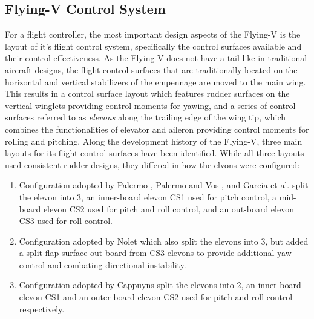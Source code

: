 \documentclass[../report.tex]{subfiles}
\begin{document}
\subsection{Flying-V Control System}\label{subsec:v_fcs}

For a flight controller, the most important design aspects of the Flying-V is the layout of it's flight control system, specifically the control surfaces available and their control effectiveness. As the Flying-V does not have a tail like in traditional aircraft designs, the flight control surfaces that are traditionally located on the horizontal and vertical stabilizers of the empennage are moved to the main wing. This results in a control surface layout which features rudder surfaces on the vertical winglets providing control moments for yawing, and a series of control surfaces referred to as \textit{elevons} along the trailing edge of the wing tip, which combines the functionalities of elevator and aileron providing control moments for rolling and pitching. Along the development history of the Flying-V, three main layouts for its flight control surfaces have been identified. While all three layouts used consistent rudder designs, they differed in how the elvons were configured:

\begin{enumerate}
    \item Configuration adopted by Palermo \cite{palermo2019longitudinal}, Palermo and Vos \cite{palermo2020experimental}, and Garcia et al. \cite{ruiz2020aerodynamic} split the elevon into 3, an inner-board elevon CS1 used for pitch control, a mid-board elevon CS2 used for pitch and roll control, and an out-board elevon CS3 used for roll control.
    \item Configuration adopted by Nolet \cite{split_flap_nolet} which also split the elevons into 3, but added a split flap surface out-board from CS3 elevons to provide additional yaw control and combating directional instability.    
    \item Configuration adopted by Cappuyns \cite{cappuyns2019handling} split the elevons into 2, an inner-board elevon CS1 and an outer-board elevon CS2 used for pitch and roll control respectively.
\end{enumerate}
\end{document}
